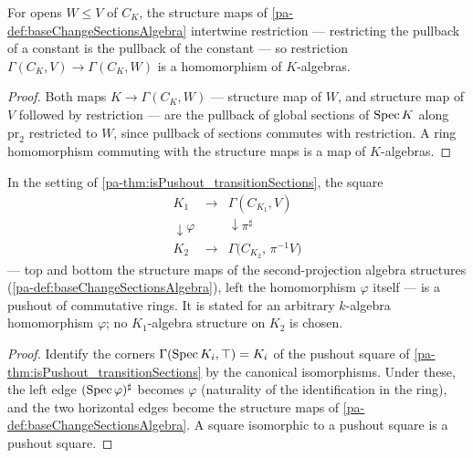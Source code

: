 \begin{lemma}
  \label{pa-lem:baseChangeResAlgHom}
  \leanok

  For opens \(W \le V\) of \(C_K\), the structure maps of
  \ref{pa-def:baseChangeSectionsAlgebra} intertwine restriction --- restricting the
  pullback of a constant is the pullback of the constant --- so restriction
  \(\Gamma(C_K, V) \to \Gamma(C_K, W)\) is a homomorphism of \(K\)-algebras.
\end{lemma}
\begin{proof}
  \leanok
  Both maps \(K \to \Gamma(C_K, W)\) --- structure map of \(W\), and structure map of
  \(V\) followed by restriction --- are the pullback of global sections of \(\operatorname{Spec} K\)
  along \(\mathrm{pr}_2\) restricted to \(W\), since pullback of sections commutes with
  restriction. A ring homomorphism commuting with the structure maps is a map of
  \(K\)-algebras.
\end{proof}

\begin{theorem}
  \label{pa-thm:isPushout_algebraMap_transitionSections}
  \leanok

  In the setting of \ref{pa-thm:isPushout_transitionSections}, the square
  \[
    \begin{array}{ccc}
      K_1 & \longrightarrow & \Gamma(C_{K_1}, V) \\
      \downarrow \varphi & & \downarrow \pi^{\sharp} \\
      K_2 & \longrightarrow & \Gamma\bigl(C_{K_2},\, \pi^{-1}V\bigr)
    \end{array}
  \]
  --- top and bottom the structure maps of the second-projection algebra structures
  (\ref{pa-def:baseChangeSectionsAlgebra}), left the homomorphism \(\varphi\) itself --- is
  a pushout of commutative rings. It is stated for an arbitrary \(k\)-algebra
  homomorphism \(\varphi\); no \(K_1\)-algebra structure on \(K_2\) is chosen.
\end{theorem}
\begin{proof}
  \leanok
  Identify the corners \(\Gamma(\operatorname{Spec} K_i, \top) = K_i\) of the pushout square of
  \ref{pa-thm:isPushout_transitionSections} by the canonical isomorphisms. Under these, the
  left edge \((\operatorname{Spec}\varphi)^{\sharp}\) becomes \(\varphi\) (naturality of the
  identification in the ring), and the two horizontal edges become the structure maps of
  \ref{pa-def:baseChangeSectionsAlgebra}. A square isomorphic to a pushout square is a
  pushout square.
\end{proof}

